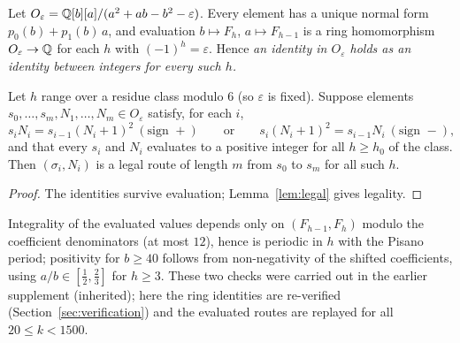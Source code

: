 Let $O_\varepsilon=\mathbb{Q}[b][a]/(a^2+ab-b^2-\varepsilon)$. Every element has a unique normal form $p_0(b)+p_1(b)\,a$, and evaluation $b\mapsto F_h$, $a\mapsto F_{h-1}$ is a ring homomorphism $O_\varepsilon\to\mathbb{Q}$ for each $h$ with $(-1)^h=\varepsilon$. Hence \emph{an identity in $O_\varepsilon$ holds as an identity between integers for every such $h$.}
\begin{proposition}\label{prop:ring}
Let $h$ range over a residue class modulo $6$ (so $\varepsilon$ is fixed). Suppose elements $s_0,\dots,s_m,N_1,\dots,N_m\in O_\varepsilon$ satisfy, for each $i$,
\[
s_iN_i=s_{i-1}(N_i+1)^2\ (\text{sign }+)\qquad\text{or}\qquad s_i(N_i+1)^2=s_{i-1}N_i\ (\text{sign }-),
\]
and that every $s_i$ and $N_i$ evaluates to a positive integer for all $h\ge h_0$ of the class. Then $(\sigma_i,N_i)$ is a legal route of length $m$ from $s_0$ to $s_m$ for all such $h$.
\end{proposition}
\begin{proof} The identities survive evaluation; Lemma~\ref{lem:legal} gives legality. \end{proof}
Integrality of the evaluated values depends only on $(F_{h-1},F_h)$ modulo the coefficient denominators (at most $12$), hence is periodic in $h$ with the Pisano period; positivity for $b\ge40$ follows from non-negativity of the shifted coefficients, using $a/b\in[\tfrac12,\tfrac23]$ for $h\ge3$. These two checks were carried out in the earlier supplement (inherited); here the ring identities are re-verified (Section~\ref{sec:verification}) and the evaluated routes are replayed for all $20\le k<1500$.

